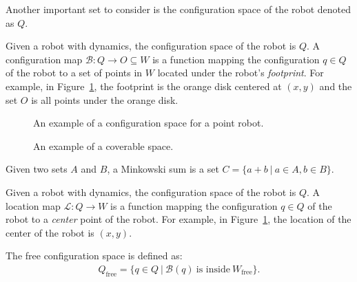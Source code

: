 \documentclass[../main.tex]{subfiles}
\begin{document}
Another important set to consider is the configuration space of the robot denoted as $Q$.
\begin{definition}
\label{definition:c_space_and_map}
Given a robot with dynamics, the configuration space of the robot is $Q$. A configuration map $\mathcal{B}:Q\to O\subseteq W$ is a function mapping the configuration $q\in Q$ of the robot to a set of points in $W$ located under the robot's \emph{footprint}. For example, in Figure~\ref{fig:configuration_space}, the footprint is the orange disk centered at $(x,y)$ and the set $O$ is all points under the orange disk.
\end{definition}

\begin{figure}
	\centering
	
	\caption{An example of a configuration space for a point robot.}
	\label{fig:configuration_space}
\end{figure}

\begin{figure}
	\centering
	
	\caption{An example of a coverable space.}
	\label{fig:coverable_space}
\end{figure}


\begin{definition}
Given two sets $A$ and $B$, a Minkowski sum is a set $C=\{a+b\ |\ a\in A, b\in B\}$.
\end{definition}





\begin{definition}
\label{definition:location_map}
Given a robot with dynamics, the configuration space of the robot is $Q$. A location map $\mathcal{L}:Q\to W$ is a function mapping the configuration $q\in Q$ of the robot to a \emph{center} point of the robot. For example, in Figure~\ref{fig:configuration_space}, the location of the center of the robot is $(x,y)$.
\end{definition}

\begin{definition}
\label{definition:free_c_space}
The free configuration space is defined as:
	\begin{equation}
	\begin{aligned}
		Q_{\text{free}}=\{q\in Q\ |\ \mathcal{B}(q)\ \text{is inside}\ W_{\text{free}}\}.
	\end{aligned}
	\end{equation}
\end{definition}
\end{document}
